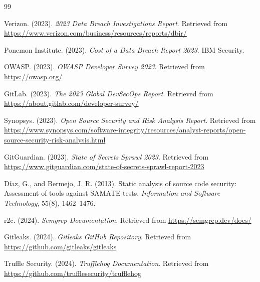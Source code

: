 \documentclass[12pt,a4paper]{report}
\begin{document}
\begingroup
\renewcommand{\chapter}[2]{}
\sloppy
\begin{thebibliography}{99}

Verizon. (2023). \textit{2023 Data Breach Investigations Report}. Retrieved from \url{https://www.verizon.com/business/resources/reports/dbir/}

Ponemon Institute. (2023). \textit{Cost of a Data Breach Report 2023}. IBM Security.

OWASP. (2023). \textit{OWASP Developer Survey 2023}. Retrieved from \url{https://owasp.org/}

GitLab. (2023). \textit{The 2023 Global DevSecOps Report}. Retrieved from \url{https://about.gitlab.com/developer-survey/}

Synopsys. (2023). \textit{Open Source Security and Risk Analysis Report}. Retrieved from \url{https://www.synopsys.com/software-integrity/resources/analyst-reports/open-source-security-risk-analysis.html}

GitGuardian. (2023). \textit{State of Secrets Sprawl 2023}. Retrieved from \url{https://www.gitguardian.com/state-of-secrets-sprawl-report-2023}

D\'iaz, G., and Bermejo, J. R. (2013). Static analysis of source code security: Assessment of tools against SAMATE tests. \textit{Information and Software Technology}, 55(8), 1462--1476.

r2c. (2024). \textit{Semgrep Documentation}. Retrieved from \url{https://semgrep.dev/docs/}

Gitleaks. (2024). \textit{Gitleaks GitHub Repository}. Retrieved from \url{https://github.com/gitleaks/gitleaks}

Truffle Security. (2024). \textit{Trufflehog Documentation}. Retrieved from \url{https://github.com/trufflesecurity/trufflehog}


\end{thebibliography}
\end{document}
